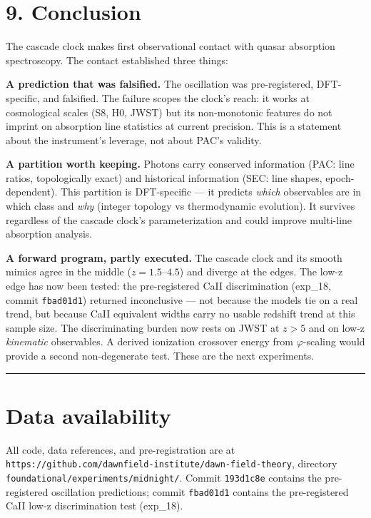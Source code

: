 \documentclass[11pt,a4paper]{article}
\begin{document}
\section*{9. Conclusion}

The cascade clock makes first observational contact with quasar absorption spectroscopy. The contact established three things:

\textbf{A prediction that was falsified.} The oscillation was pre-registered, DFT-specific, and falsified. The failure scopes the clock's reach: it works at cosmological scales (S8, H0, JWST) but its non-monotonic features do not imprint on absorption line statistics at current precision. This is a statement about the instrument's leverage, not about PAC's validity.

\textbf{A partition worth keeping.} Photons carry conserved information (PAC: line ratios, topologically exact) and historical information (SEC: line shapes, epoch-dependent). This partition is DFT-specific — it predicts \emph{which} observables are in which class and \emph{why} (integer topology vs thermodynamic evolution). It survives regardless of the cascade clock's parameterization and could improve multi-line absorption analysis.

\textbf{A forward program, partly executed.} The cascade clock and its smooth mimics agree in the middle ($z = 1.5$–$4.5$) and diverge at the edges. The low-z edge has now been tested: the pre-registered CaII discrimination (exp\_18, commit \texttt{fbad01d1}) returned inconclusive — not because the models tie on a real trend, but because CaII equivalent widths carry no usable redshift trend at this sample size. The discriminating burden now rests on JWST at $z > 5$ and on low-z \emph{kinematic} observables. A derived ionization crossover energy from $\varphi$-scaling would provide a second non-degenerate test. These are the next experiments.

\begin{center}\rule{0.5\linewidth}{0.4pt}\end{center}

\section*{Data availability}

All code, data references, and pre-registration are at \texttt{https://github.com/dawnfield-institute/dawn-field-theory}, directory \texttt{foundational/experiments/midnight/}. Commit \texttt{193d1c8e} contains the pre-registered oscillation predictions; commit \texttt{fbad01d1} contains the pre-registered CaII low-z discrimination test (exp\_18).
\end{document}
